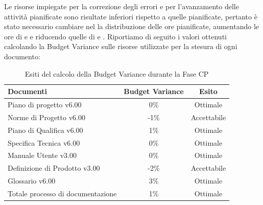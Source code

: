 Le risorse impiegate per la correzione degli errori e per l'avanzamento delle attività pianificate sono risultate inferiori rispetto a quelle pianificate, pertanto è stato necessario cambiare nel  la distribuzione delle ore pianificate, aumentando le ore di  e  e riducendo quelle di  e .
Riportiamo di seguito i valori ottenuti calcolando la Budget Variance sulle risorse utilizzate per la stesura di ogni documento:
			\begin{table}[H]
					\centering
					\begin{tabu}{| l | c | c |}
							\hline
							Documenti 							& Budget Variance	& Esito		\\ \hline \hline
							
							Piano di progetto v6.00				& 0\% 		& Ottimale  \\ \hline
							Norme di Progetto v6.00 			& -1\%		& Accettabile  \\ \hline
							Piano di Qualifica v6.00 			& 1\%		& Ottimale  \\ \hline
							Specifica Tecnica v6.00 			& 0\%		& Ottimale  \\ \hline
							Manuale Utente v3.00 			& 0\%		& Ottimale  \\ \hline
							Definizione di Prodotto v3.00 			& -2\%		& Accettabile  \\ \hline
							Glossario v6.00					 	& 3\% 		& Ottimale  \\ \hline
							Totale processo di documentazione & 1\% & Ottimale \\ \hline
						\end{tabu}
					\caption{Esiti del calcolo della Budget Variance durante la Fase CP}
				\end{table}
				
